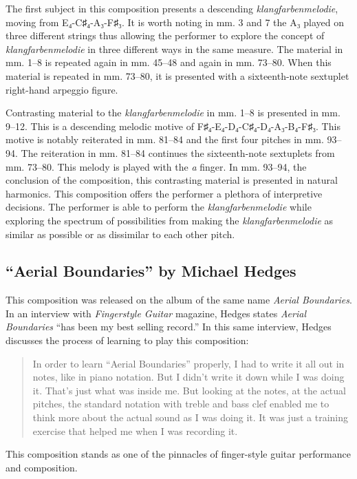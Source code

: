 \documentclass{tufte-handout}
\begin{document}
The first subject in this composition presents a descending \emph{klangfarbenmelodie}, moving from E₄-C♯₄-A₃-F♯₃. It is worth noting in mm. 3 and 7 the A₃ played on three different strings thus allowing the performer to explore the concept of \emph{klangfarbenmelodie} in three different ways in the same measure. The material in mm. 1–8 is repeated again in mm. 45–48 and again in mm. 73–80. When this material is repeated in mm. 73–80, it is presented with a sixteenth-note sextuplet right-hand arpeggio figure.

Contrasting material to the \emph{klangfarbenmelodie} in mm. 1–8 is presented in mm. 9–12. This is a descending melodic motive of F♯₄-E₄-D₄-C♯₄-D₄-A₃-B₄-F♯₃. This motive is notably reiterated in mm. 81–84 and the first four pitches in mm. 93–94. The reiteration in mm. 81–84 continues the sixteenth-note sextuplets from mm. 73–80. This melody is played with the \emph{a} finger. In mm. 93–94, the conclusion of the composition, this contrasting material is presented in natural harmonics. This composition offers the performer a plethora of interpretive decisions. The performer is able to perform the \emph{klangfarbenmelodie} while exploring the spectrum of possibilities from making the \emph{klangfarbenmelodie}  as similar as possible or as dissimilar to each other pitch.
\subsection*{``Aerial Boundaries'' by Michael Hedges}
This composition was released on the album of the same name \emph{Aerial Boundaries}. In an interview with \emph{Fingerstyle Guitar} magazine, Hedges states \emph{Aerial Boundaries} ``has been my best selling record.'' In this same interview, Hedges discusses the process of learning to play this composition:
\begin{quote}
  In order to learn ``Aerial Boundaries'' properly, I had to write it all out in notes, like in piano notation. But I didn't write it down while I was doing it. That's just what was inside me. But looking at the notes, at the actual pitches, the standard notation with treble and bass clef enabled me to think more about the actual sound as I was doing it. It was just a training exercise that helped me when I was recording it.
\end{quote}
This composition stands as one of the pinnacles of finger-style guitar performance and composition.
\end{document}
